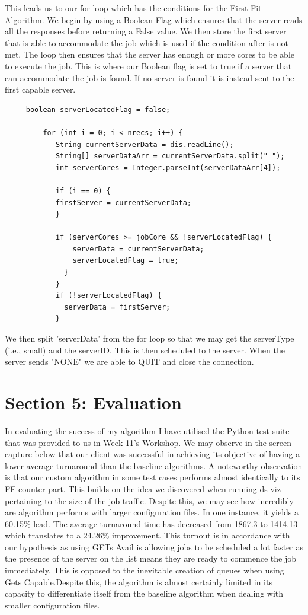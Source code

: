 \documentclass[a4paper]{article} %
\begin{document}
This leads us to our for loop which has the conditions for the First-Fit Algorithm. We begin by using a Boolean Flag which ensures that the server reads all the responses before returning a False value. We then store the first server that is able to accommodate the job which is used if the condition after is not met. The loop then ensures that the server has enough or more cores to be able to execute the job. This is where our Boolean flag is set to true if a server that can accommodate the job is found. If no server is found it is instead sent to the first capable server.
\begin{verbatim}
     boolean serverLocatedFlag = false;

         for (int i = 0; i < nrecs; i++) {
            String currentServerData = dis.readLine();
            String[] serverDataArr = currentServerData.split(" ");
            int serverCores = Integer.parseInt(serverDataArr[4]);
            
            if (i == 0) {
            firstServer = currentServerData;
            }
            
            if (serverCores >= jobCore && !serverLocatedFlag) {
                serverData = currentServerData;
                serverLocatedFlag = true;
              }
            }
            if (!serverLocatedFlag) {
              serverData = firstServer;
            }
\end{verbatim}

We then split 'serverData' from the for loop so that we may get the serverType (i.e., small) and the serverID. This is then scheduled to the server. When the server sends "NONE" we are able to QUIT and close the connection.

\section{Section 5: Evaluation}
In evaluating the success of my algorithm I have utilised the Python test suite that was provided to us in Week 11's Workshop. We may observe in the screen capture below that our client was successful in achieving its objective of having a lower average turnaround than the baseline algorithms. A noteworthy observation is that our custom algorithm in some test cases performs almost identically to its FF counter-part. This builds on the idea we discovered when running ds-viz pertaining to the size of the job traffic. Despite this, we may see how incredibly are algorithm performs with larger configuration files. In one instance, it yields a 60.15\% lead. The average turnaround time has decreased from 1867.3 to 1414.13 which translates to a 24.26\% improvement. This turnout is in accordance with our hypothesis as using GETs Avail is allowing jobs to be scheduled a lot faster as the presence of the server on the list means they are ready to commence the job immediately. This is opposed to the inevitable creation of queues when using Gets Capable.Despite this, the algorithm is almost certainly limited in its capacity to differentiate itself from the baseline algorithm when dealing with smaller configuration files. 
\end{document}
